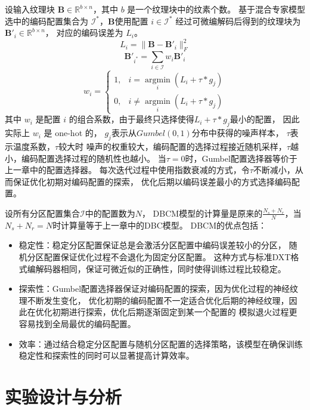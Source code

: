 设输入纹理块 $\mathbf{B}\in\mathbb{R}^{b\times n}$，其中 $b$ 是一个纹理块中的纹素个数。
基于混合专家模型选中的编码配置集合为 $\mathcal{I}^*$，$\mathbf{B}$使用配置 $i\in\mathcal{I}^*$ 
经过可微编解码后得到的纹理块为 $\mathbf{B}'_i\in\mathbb{R}^{b\times n}$，
对应的编码误差为 $L_i$。
\begin{equation}
L_i=\|\mathbf{B}-\mathbf{B}'_i\|_F^2
\end{equation}
\begin{equation}
\mathbf{B}'_{i^*}=\sum_{i\in\mathcal{I}} w_i\mathbf{B}'_i
\end{equation}
\begin{equation}
    w_i =\left\{\begin{matrix}
        1,& i=\mathop{\arg\min}\limits_{i} (L_i+\tau*g_j)
        \\0,& i\ne\mathop{\arg\min}\limits_{i} (L_i+\tau*g_j)
        \end{matrix}\right.
\end{equation}
其中 $w_i$ 是配置 $i$ 的组合系数，由于最终只选择使得$L_i+\tau*g_j$最小的配置，
因此实际上 $w_i$ 是 one-hot 的，
$g_j$表示从$Gumbel(0,1)$分布中获得的噪声样本，
$\tau$表示温度系数，$\tau$较大时
噪声的权重较大，编码配置的选择过程接近随机采样，$\tau$越小，编码配置选择过程的随机性也越小。
当$\tau=0$时，Gumbel配置选择器等价于上一章中的配置选择器。
每次迭代过程中使用指数衰减的方式，令$\tau$不断减小，从而保证优化初期对编码配置的探索，
优化后期以编码误差最小的方式选择编码配置。

设所有分区配置集合$\mathcal{I}$中的配置数为$N$，
DBCM模型的计算量是原来的$\frac{N_s+N_r}{N}$，当$N_s+N_r=N$时计算量等于上一章中的DBC模型。
DBCM的优点包括：
\begin{itemize}
\item 稳定性：稳定分区配置保证总是会激活分区配置中编码误差较小的分区，
随机分区配置保证优化过程不会退化为固定分区配置。
这种方式与标准DXT格式编解码器相同，保证可微近似的正确性，同时使得训练过程比较稳定。
\item 探索性：Gumbel配置选择器保证对编码配置的探索，因为优化过程的神经纹理不断发生变化，
优化初期的编码配置不一定适合优化后期的神经纹理，因此在优化初期进行探索，优化后期逐渐固定到某一个配置的
模拟退火过程更容易找到全局最优的编码配置。
\item 效率：通过结合稳定分区配置与随机分区配置的选择策略，该模型在确保训练稳定性和探索性的同时可以显著提高计算效率。
\end{itemize}


\section{实验设计与分析}

